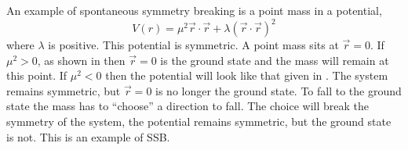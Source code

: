 An example of spontaneous symmetry breaking is a point mass in a potential,
\begin{equation}
V(r) = \mu^{2} \vec{r} \cdot \vec{r} + \lambda ( \vec{r} \cdot \vec{r} )^{2}
\end{equation}
where $\lambda$ is positive. This potential is symmetric. 
A point mass sits at $\vec{r}=0$. If $\mu^{2}>0$, as shown in
 then $\vec{r}=0$ is the ground state and
the mass will remain at this point.
If $\mu^{2}<0$ then the potential will look like that given in
. The system remains symmetric, but $\vec{r}=0$ is no longer
the ground state. To fall to the ground state the mass has to ``choose'' a
direction to fall. The choice will break the symmetry of the system, the
potential remains symmetric, but the ground state is not. This is an example of
{SSB}.

